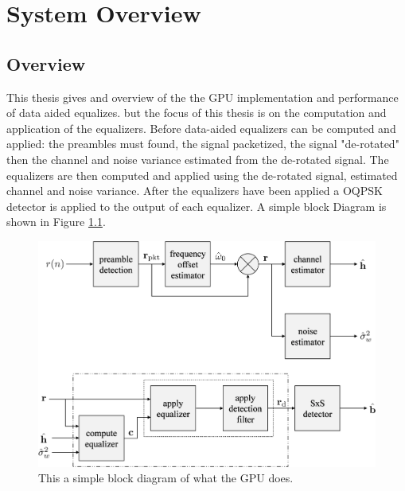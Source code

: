

\chapter{System Overview}
\label{sec:systemOverview}

\section{Overview}
This thesis gives and overview of the the GPU implementation and performance of data aided equalizes.
but the focus of this thesis is on the computation and application of the equalizers.
Before data-aided equalizers can be computed and applied: the preambles must found, the signal packetized, the signal "de-rotated" then the channel and noise variance estimated from the de-rotated signal.
The equalizers are then computed and applied using the de-rotated signal, estimated channel and noise variance.
After the equalizers have been applied a OQPSK detector is applied to the output of each equalizer.
A simple block Diagram is shown in Figure \ref{fig:simpleBlockDiagram}.
\begin{figure}
	\centering\includegraphics[width=6in]{figures/systemOverview/blockDiagram.pdf}
	\caption{This a simple block diagram of what the GPU does.}
	\label{fig:simpleBlockDiagram}
\end{figure}

